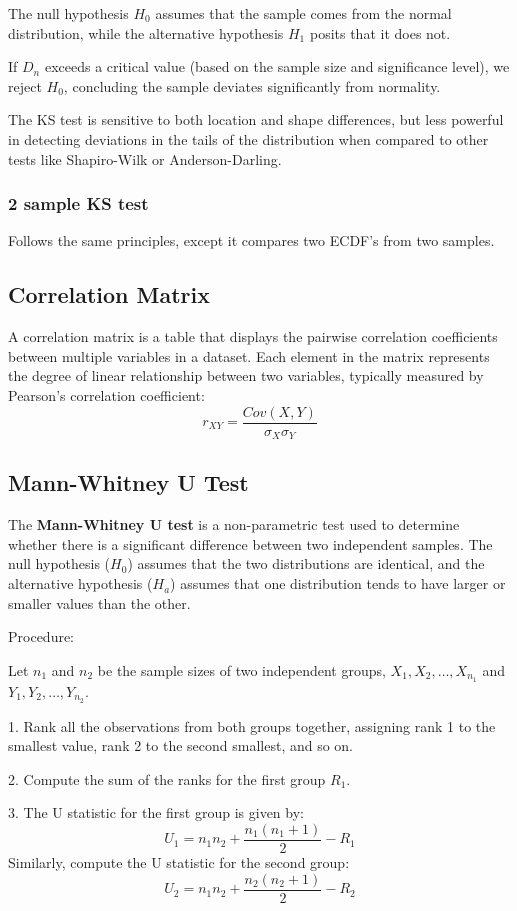 \documentclass[conference]{IEEEtran}
\begin{document}
The null hypothesis $H_0$ assumes that the sample comes from the normal distribution, while the alternative hypothesis $H_1$ posits that it does not.

    If $D_n$ exceeds a critical value (based on the sample size and significance level), we reject $H_0$, concluding the sample deviates significantly from normality.

The KS test is sensitive to both location and shape differences, but less powerful in detecting deviations in the tails of the distribution when compared to other tests like Shapiro-Wilk or Anderson-Darling.
\subsubsection*{2 sample KS test}
Follows the same principles, except it compares two ECDF's from two samples.
\subsection{Correlation Matrix}
A correlation matrix is a table that displays the pairwise correlation coefficients between multiple variables in a dataset. Each element in the matrix represents the degree of linear relationship between two variables, typically measured by Pearson's correlation coefficient:
\[r_{XY} = \frac{Cov(X,Y)}{\sigma_X\sigma_Y}\]

\subsection{Mann-Whitney U Test}
The \textbf{Mann-Whitney U test} is a non-parametric test used to determine whether there is a significant difference between two independent samples. The null hypothesis (\(H_0\)) assumes that the two distributions are identical, and the alternative hypothesis (\(H_a\)) assumes that one distribution tends to have larger or smaller values than the other.


Procedure:

Let \( n_1 \) and \( n_2 \) be the sample sizes of two independent groups, \( X_1, X_2, \dots, X_{n_1} \) and \( Y_1, Y_2, \dots, Y_{n_2} \).

1. Rank all the observations from both groups together, assigning rank 1 to the smallest value, rank 2 to the second smallest, and so on.

2. Compute the sum of the ranks for the first group \( R_1 \).

3. The U statistic for the first group is given by:
\[
U_1 = n_1 n_2 + \frac{n_1(n_1 + 1)}{2} - R_1
\]
Similarly, compute the U statistic for the second group:
\[
U_2 = n_1 n_2 + \frac{n_2(n_2 + 1)}{2} - R_2
\]
\end{document}
